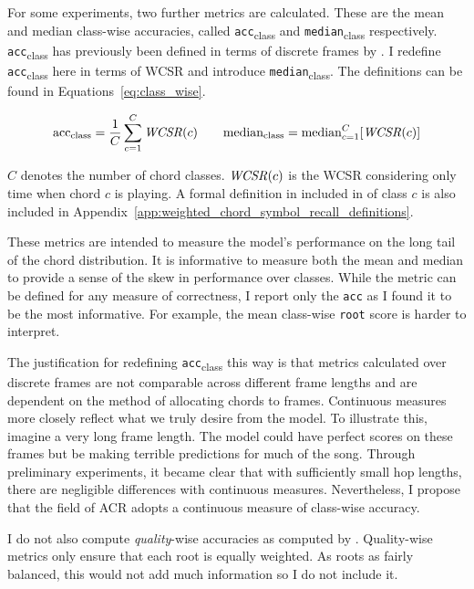 For some experiments, two further metrics are calculated. These are the mean and median class-wise accuracies, called \texttt{acc}\textsubscript{class} and \texttt{median}\textsubscript{class} respectively. \texttt{acc}\textsubscript{class} has previously been defined in terms of discrete frames by \citet{ACRLargeVocab1}. I redefine \texttt{acc}\textsubscript{class} here in terms of WCSR and introduce \texttt{median}\textsubscript{class}. The definitions can be found in Equations~\ref{eq:class_wise}.

\begin{equation}\label{eq:class_wise}
    \text{acc}\textsubscript{class} = \frac{1}{C} \sum_{c=1}^{C} \text{\emph{WCSR}}(c)
\quad \quad
    \text{median}\textsubscript{class} = \text{median}_{c=1}^{C} [\text{\emph{WCSR}}(c)]
\end{equation}

$C$ denotes the number of chord classes. $\text{\emph{WCSR}}(c)$ is the WCSR considering only time when chord $c$ is playing. A formal definition in included in of class $c$ is also included in Appendix~\ref{app:weighted_chord_symbol_recall_definitions}.

These metrics are intended to measure the model's performance on the long tail of the chord distribution. It is informative to measure both the mean and median to provide a sense of the skew in performance over classes. While the metric can be defined for any measure of correctness, I report only the \texttt{acc} as I found it to be the most informative. For example, the mean class-wise \texttt{root} score is harder to interpret.

The justification for redefining \texttt{acc}\textsubscript{class} this way is that metrics calculated over discrete frames are not comparable across different frame lengths and are dependent on the method of allocating chords to frames. Continuous measures more closely reflect what we truly desire from the model. To illustrate this, imagine a very long frame length. The model could have perfect scores on these frames but be making terrible predictions for much of the song. Through preliminary experiments, it became clear that with sufficiently small hop lengths, there are negligible differences with continuous measures. Nevertheless, I propose that the field of ACR adopts a continuous measure of class-wise accuracy.

I do not also compute \emph{quality}-wise accuracies as computed by \citet{CurriculumLearning}. Quality-wise metrics only ensure that each root is equally weighted. As roots as fairly balanced, this would not add much information so I do not include it.

